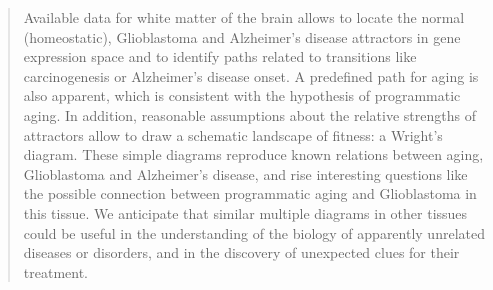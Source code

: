 \begin{quote}

{\large Available data for white matter of the brain allows to locate the normal (homeostatic), Glioblastoma and Alzheimer’s disease attractors in gene expression space and to identify paths related to transitions like carcinogenesis or Alzheimer’s disease onset. A predefined path for aging is also apparent, which is consistent with the hypothesis of programmatic aging. In addition, reasonable assumptions about the relative strengths of attractors allow to draw a schematic landscape of fitness: a Wright’s diagram. These simple diagrams reproduce known relations between aging, Glioblastoma and Alzheimer’s disease, and rise interesting questions like the possible connection between programmatic aging and Glioblastoma in this tissue. We anticipate that similar multiple diagrams in other tissues could be useful in the understanding of the biology of apparently unrelated diseases or disorders, and in the discovery of unexpected clues for their treatment.
}


\end{quote}

\vfill
\cleardoublepage
